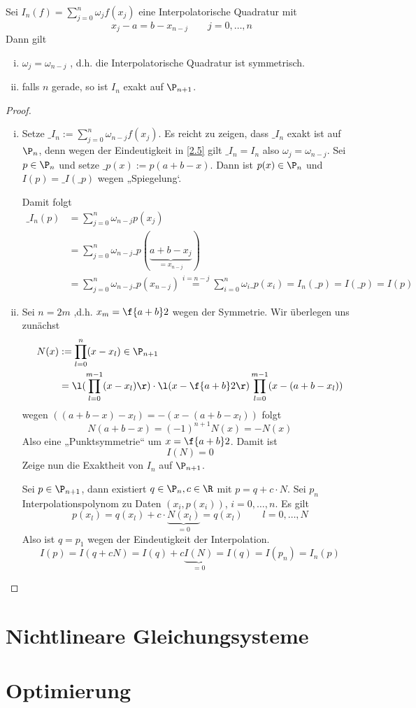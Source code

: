 \documentclass[a4paper,11pt]{scrartcl}
\begin{document}
\begin{st}
	\label{2.6}
	Sei $I_n(f) = \sum_{j=0}^n \omega_j f(x_j)$ eine Interpolatorische Quadratur mit
	\[
		x_j - a = b - x_{n-j} \qquad j=0,\dotsc,n
	\]
	Dann gilt
	\begin{enumerate}[i)]
		\item
			$\omega_j = \omega_{n-j}$ , d.h. die Interpolatorische Quadratur ist symmetrisch.
		\item
			falls $n$ gerade, so ist $I_n$ exakt auf $\P_{n+1}$.
	\end{enumerate}
	\begin{proof}
		\begin{enumerate}[i)]
			\item
				Setze $\_{I_n} := \sum_{j=0}^n \omega_{n-j}f(x_j)$.
				Es reicht zu zeigen, dass $\_{I_n}$ exakt ist auf $\P_n$, denn wegen der Eindeutigkeit in \ref{2.5} gilt $\_{I_n}=I_n$ also $\omega_j=\omega_{n-j}$.
				Sei $p\in \P_n$ und setze $\_p(x) := p(a+b-x)$.
				Dann ist $p(x) \in \P_n$ und $I(p) = \_I(\_p)$ wegen „Spiegelung‘.

				Damit folgt
				\begin{align*}
					\_I_n (p) &= \sum_{j=0}^n \omega_{n-j}p(x_j) \\
					&=\sum_{j=0}^n \omega_{n-j} \_p(\underbrace{a+b-x_j}_{=x_{n-j}}) \\
					&=\sum_{j=0}^n \omega_{n-j}\_p(x_{n-j})
					\stackrel{i=n-j} = \sum_{i=0}^n \omega_i \_p(x_i)
					= I_n (\_p) = I(\_p) = I(p)
				\end{align*}
			\item
				Sei $n=2m$ ,d.h. $x_m = \f {a+b}2$ wegen der Symmetrie.
				Wir überlegen uns zunächst
				\begin{align*}
					N(x) &:= \prod_{l=0}^n (x-x_l) \in \P_{n+1} \\
					&= \l( \prod_{l=0}^{m-1}(x-x_l)\r) \cdot \l(x-\f {a+b}2\r) \prod_{l=0}^{m-1}(x-(a+b-x_l))
				\end{align*}
				wegen $((a+b-x)-x_l) = -(x-(a+b-x_l))$ folgt
				\[
					N(a+b-x) = (-1)^{n+1}N(x) = - N(x)
				\]
				Also eine „Punktsymmetrie“ um $x = \f {a+b}2$.
				Damit ist
				\[
					I(N) = 0
				\]
				Zeige nun die Exaktheit von $I_n$ auf $\P_{n+1}$.

				Sei $p\in \P_{n+1}$, dann existiert $q\in \P_n, c\in \R$ mit $p=q+c\cdot N$.
				Sei $p_n$ Interpolationspolynom zu Daten $(x_i,p(x_i))$, $i=0,\dotsc,n$.
				Es gilt
				\[
					p(x_l) = q(x_l) + c\cdot \underbrace{N(x_l)}_{=0} = q(x_l) \qquad l=0,\dotsc,N
				\]
				Also ist $q=p_1$ wegen der Eindeutigkeit der Interpolation.
				\[
					I(p) = I(q+cN) = I(q) + c\underbrace{I(N)}_{=0} = I(q) = I(p_n) = I_n(p)
				\]
		\end{enumerate}
	\end{proof}
\end{st}

\section{Nichtlineare Gleichungsysteme}

\section{Optimierung}
\end{document}
